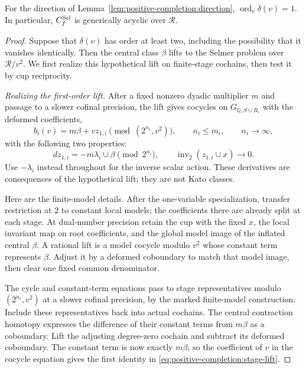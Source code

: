 \begin{lemma}\label{lem:positive-completion:bockstein}
For the direction of Lemma~\ref{lem:positive-completion:direction},
\(\operatorname{ord}_v\delta(v)=1\). In particular,
\(C_f^{\rm Sel}\) is generically acyclic over \(\mathcal R\).
\end{lemma}
\begin{proof}
Suppose that \(\delta(v)\) has order at least two, including the
possibility that it vanishes identically. Then the central class
\(\beta\) lifts to the Selmer problem over \(\mathcal R/v^2\).
We first realize this hypothetical lift on finite-stage cochains,
then test it by cup reciprocity.

\emph{Realizing the first-order lift.}
After a fixed nonzero dyadic multiplier \(m\) and passage to a slower
cofinal precision, the lift gives cocycles on
\(G_{\mathbb Q,S\cup R_i}\) with the deformed coefficients,
\[
 b_i(v)=m\beta+v z_{1,i}\pmod{(2^{n_i},v^2)},
 \qquad n_i\le m_i,\qquad n_i\longrightarrow\infty,
\]
with the following two properties:
\begin{equation}\label{eq:positive-completion:stage-lift}
 d z_{1,i}=-m\lambda_i\cup\beta\pmod{2^{n_i}},
 \qquad
 \operatorname{inv}_2(z_{1,i}\cup x)\longrightarrow0.
\end{equation}
Use \(-\lambda_i\) instead throughout for the inverse scalar action.
These derivatives are consequences of the hypothetical lift; they
are not Kato classes.

Here are the finite-model details. After the one-variable
specialization, transfer restriction at \(2\) to constant local
models; the coefficients there are already split at each stage.
At dual-number precision retain the cup with the fixed \(x\), the
local invariant map on root coefficients, and the global model image
of the inflated central \(\beta\). A rational lift is a model
cocycle modulo \(v^2\) whose constant term represents \(\beta\).
Adjust it by a deformed coboundary to match that model image, then
clear one fixed common denominator.

The cycle and constant-term equations pass to stage representatives
modulo \((2^{n_i},v^2)\) at a slower cofinal precision, by the marked
finite-model construction. Include these representatives back into
actual cochains. The central contraction homotopy expresses the
difference of their constant terms from \(m\beta\) as a coboundary.
Lift the adjusting degree-zero cochain and subtract its deformed
coboundary. The constant term is now exactly \(m\beta\), so the
coefficient of \(v\) in the cocycle equation gives the first identity
in \eqref{eq:positive-completion:stage-lift}.


\end{proof}
